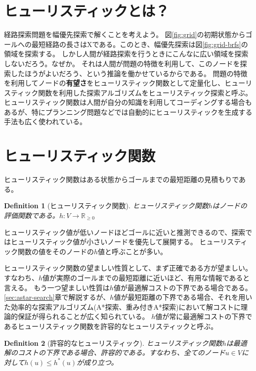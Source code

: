 \documentclass[b5paper]{report}
\newtheorem{definition}{Definition}
\begin{document}
\section{ヒューリスティックとは？}
\label{sec:heursitic}

経路探索問題を幅優先探索で解くことを考えよう。
図\ref{fig:grid}の初期状態からゴールへの最短経路の長さはXである。このとき、幅優先探索は図\ref{fig:grid-brfs}の領域を探索する。
しかし人間が経路探索を行うときにこんなに広い領域を探索しないだろう。なぜか。
それは人間が問題の特徴を利用して、このノードを探索したほうがよいだろう、という推論を働かせているからである。
問題の特徴を利用してノードの{\bf 有望さ}をヒューリスティック関数として定量化し、ヒューリスティック関数を利用した探索アルゴリズムをヒューリスティック探索と呼ぶ。
ヒューリスティック関数は人間が自分の知識を利用してコーディングする場合もあるが、特にプランニング問題などでは自動的にヒューリスティックを生成する手法も広く使われている。



\section{ヒューリスティック関数}
\label{sec:heuristic-function}
ヒューリスティック関数はある状態からゴールまでの最短距離の見積もりである。

\begin{definition}[ヒューリスティック関数]
ヒューリスティック関数$h$はノードの評価関数である。$h: V \rightarrow \mathbb{R}_{\geq 0}$
\end{definition}

ヒューリスティック値が低いノードほどゴールに近いと推測できるので、探索ではヒューリスティック値が小さいノードを優先して展開する。
ヒューリスティック関数の値をそのノードの$h$値と呼ぶことが多い。

ヒューリスティック関数の望ましい性質として、まず正確である方が望ましい。すなわち、$h$値が実際のゴールまでの最短距離に近いほど、有用な情報であると言える。
もう一つ望ましい性質は$h$値が最適解コストの下界である場合である。
\ref{sec:astar-search}章で解説するが、$h$値が最短距離の下界である場合、それを用いた効率的な探索アルゴリズム(A*探索、重み付きA*探索)において解コストに理論的保証が得られることが広く知られている。
$h$値が常に最適解コストの下界であるヒューリスティック関数を許容的なヒューリスティックと呼ぶ。

\begin{definition}[許容的なヒューリスティック]
ヒューリスティック関数$h$は最適解のコストの下界である場合、許容的である。すなわち、全てのノード$u \in V$に対して$h(u) \leq h^*(u)$が成り立つ。
\end{definition}
\end{document}
